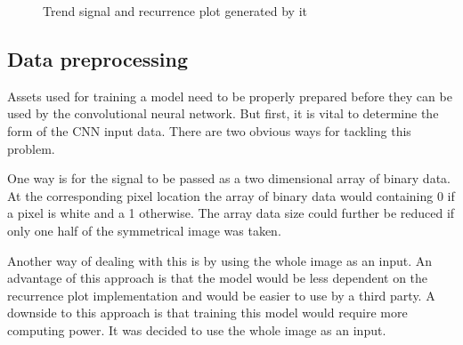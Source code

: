 \documentclass[a4paper,12pt,fleqn]{article}
\begin{document}
\begin{figure}
  \centering
  \qquad
  \caption{Trend signal and recurrence plot generated by it}
  \label{fig:generated_trend}
\end{figure}


\subsection{Data preprocessing}
Assets used for training a model need to be properly prepared before they can be used by the convolutional neural network.
But first, it is vital to determine the form of the CNN input data.
There are two obvious ways for tackling this problem.

One way is for the signal to be passed as a two dimensional array of binary data.
At the corresponding pixel location the array of binary data would containing 0 if a pixel is white and a 1 otherwise.
The array data size could further be reduced if only one half of the symmetrical image was taken.

Another way of dealing with this is by using the whole image as an input.
An advantage of this approach is that the model would be less dependent on the recurrence plot implementation and would be easier to use by a third party.
A downside to this approach is that training this model would require more computing power. It was decided to use the whole image as an input.
\end{document}
